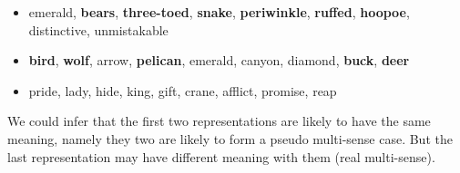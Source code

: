 \documentclass[landscape,final,b0paper,fontscale=0.285]{baposter}
\begin{document}
\begin{poster}
{\begin{spacing}{-0.5} \end{spacing}
\begin{itemize} \itemsep -2pt
\item emerald, \textbf{bears}, \textbf{three-toed}, \textbf{snake}, \textbf{periwinkle}, \textbf{ruffed}, \textbf{hoopoe}, distinctive, unmistakable
\item \textbf{bird}, \textbf{wolf}, arrow, \textbf{pelican}, emerald, canyon, diamond, \textbf{buck}, \textbf{deer}
\item pride, lady, hide, king, gift, crane, afflict, promise, reap
\end{itemize}
\begin{spacing}{0.5} \end{spacing}
We could infer that the first two representations are likely to have the same meaning, namely they two are likely to form a pseudo multi-sense case. But the last representation may have different meaning with them (real multi-sense).
   \vspace{0.3em}
  }

\end{poster}
\end{document}
